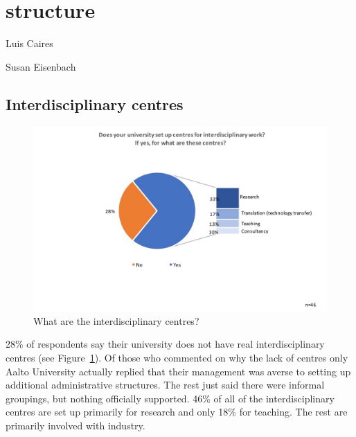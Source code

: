 \newpage
\section{structure}

Luis Caires

Susan Eisenbach


\subsection{Interdisciplinary centres}

\begin{figure}[h]
\centering
\includegraphics[width = \linewidth]{charts/5a.jpg}
\caption{What are the interdisciplinary centres?}
\label{sect5:centres}
\end{figure}

28\% of respondents say their university does not have real interdisciplinary centres (see Figure~\ref{sect5:centres}). Of those who commented on why the lack of centres only Aalto University actually replied that their management was averse to setting up additional administrative structures. The rest just said there were informal groupings, but nothing officially supported. 46\% of all of the interdisciplinary centres are set up primarily for research and only 18\% for teaching. The rest are primarily involved with industry.

